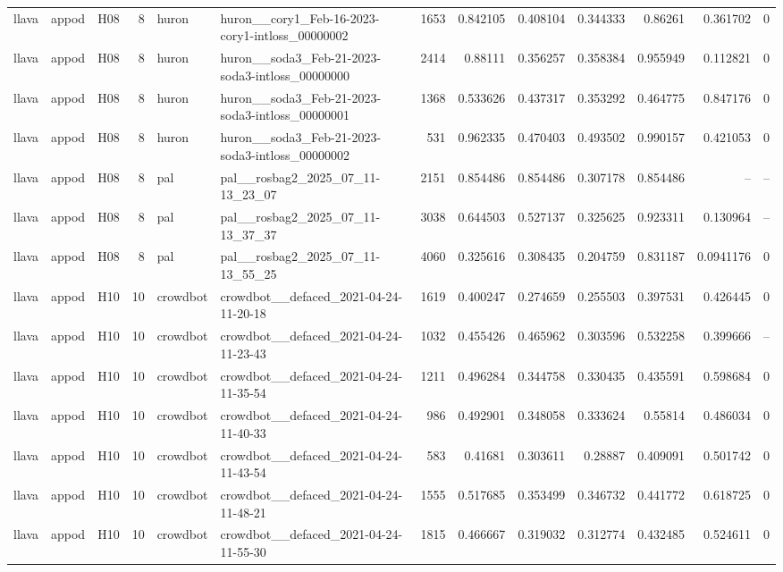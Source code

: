 \begin{longtable}{lllrllrrrrrrr}
llava & appod & H08 & 8 & huron & huron\_\_cory1\_Feb-16-2023-cory1-intloss\_00000002 & 1653 & 0.842105 & 0.408104 & 0.344333 & 0.86261 & 0.361702 & 0 \\
llava & appod & H08 & 8 & huron & huron\_\_soda3\_Feb-21-2023-soda3-intloss\_00000000 & 2414 & 0.88111 & 0.356257 & 0.358384 & 0.955949 & 0.112821 & 0 \\
llava & appod & H08 & 8 & huron & huron\_\_soda3\_Feb-21-2023-soda3-intloss\_00000001 & 1368 & 0.533626 & 0.437317 & 0.353292 & 0.464775 & 0.847176 & 0 \\
llava & appod & H08 & 8 & huron & huron\_\_soda3\_Feb-21-2023-soda3-intloss\_00000002 & 531 & 0.962335 & 0.470403 & 0.493502 & 0.990157 & 0.421053 & 0 \\
llava & appod & H08 & 8 & pal & pal\_\_rosbag2\_2025\_07\_11-13\_23\_07 & 2151 & 0.854486 & 0.854486 & 0.307178 & 0.854486 & -- & -- \\
llava & appod & H08 & 8 & pal & pal\_\_rosbag2\_2025\_07\_11-13\_37\_37 & 3038 & 0.644503 & 0.527137 & 0.325625 & 0.923311 & 0.130964 & -- \\
llava & appod & H08 & 8 & pal & pal\_\_rosbag2\_2025\_07\_11-13\_55\_25 & 4060 & 0.325616 & 0.308435 & 0.204759 & 0.831187 & 0.0941176 & 0 \\
llava & appod & H10 & 10 & crowdbot & crowdbot\_\_defaced\_2021-04-24-11-20-18 & 1619 & 0.400247 & 0.274659 & 0.255503 & 0.397531 & 0.426445 & 0 \\
llava & appod & H10 & 10 & crowdbot & crowdbot\_\_defaced\_2021-04-24-11-23-43 & 1032 & 0.455426 & 0.465962 & 0.303596 & 0.532258 & 0.399666 & -- \\
llava & appod & H10 & 10 & crowdbot & crowdbot\_\_defaced\_2021-04-24-11-35-54 & 1211 & 0.496284 & 0.344758 & 0.330435 & 0.435591 & 0.598684 & 0 \\
llava & appod & H10 & 10 & crowdbot & crowdbot\_\_defaced\_2021-04-24-11-40-33 & 986 & 0.492901 & 0.348058 & 0.333624 & 0.55814 & 0.486034 & 0 \\
llava & appod & H10 & 10 & crowdbot & crowdbot\_\_defaced\_2021-04-24-11-43-54 & 583 & 0.41681 & 0.303611 & 0.28887 & 0.409091 & 0.501742 & 0 \\
llava & appod & H10 & 10 & crowdbot & crowdbot\_\_defaced\_2021-04-24-11-48-21 & 1555 & 0.517685 & 0.353499 & 0.346732 & 0.441772 & 0.618725 & 0 \\
llava & appod & H10 & 10 & crowdbot & crowdbot\_\_defaced\_2021-04-24-11-55-30 & 1815 & 0.466667 & 0.319032 & 0.312774 & 0.432485 & 0.524611 & 0 \\

\end{longtable}
